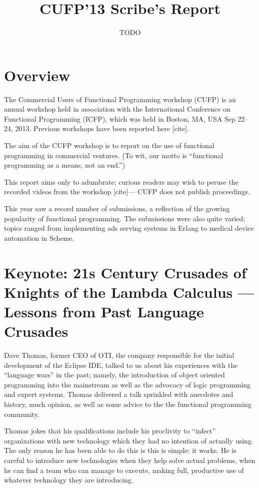 \documentclass{jfp1}
\title{CUFP'13 Scribe's Report}
\author[Authors]
        {TODO}
\newcommand\needcite{{\color{red} [cite]}\xspace}
\begin{document}
\maketitle

\tableofcontents

\section{Overview}

The Commercial Users of Functional Programming workshop (CUFP) is an
annual workshop held in association with the International Conference
on Functional Programming (ICFP), which was held in Boston, MA, USA
Sep 22--24, 2013. Previous workshops have been reported here
\needcite.

The aim of the CUFP workshop is to report on the use of functional
programming in commercial ventures. (To wit, our motto is ``functional
programming as a means, not an end.'')

This report aims only to adumbrate; curious readers may wish to peruse
the recorded videos from the workshop \needcite --- CUFP does not
publish proceedings.

This year saw a record number of submissions, a reflection of the
growing popularity of functional programming. The submissions were
also quite varied; topics ranged from implementing ads serving systems
in Erlang to medical device automation in Scheme.

\section{Keynote: 21s Century Crusades of Knights of the Lambda
Calculus — Lessons from Past Language Crusades}

Dave Thomas, former CEO of OTI, the company responsible for the
initial development of the Eclipse IDE, talked to us about his
experiences with the ``language wars'' in the past; namely, the
introduction of object oriented programming into the mainstream as
well as the advocacy of logic programming and expert systems. Thomas
delivered a talk sprinkled with anecdotes and history, much opinion,
as well as some advice to the the functional programming community.


Thomas jokes that his qualifications include his proclivity to
``infect'' organizations with new technology which they had no
intention of actually using. The only reason he has been able to do
this is this is simple: it works. He is careful to introduce new
technologies when they help solve actual problems, when he can find a
team who can manage to execute, making full, productive use of
whatever technology they are introducing.
\end{document}
